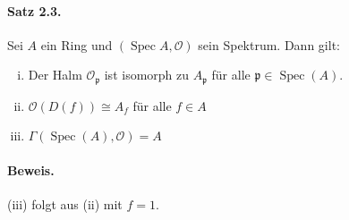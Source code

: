 \paragraph{Satz 2.3.}\label{2.3} Sei $A$ ein Ring und $(\operatorname{Spec} A,\mathcal{O})$ sein Spektrum. Dann gilt:
\begin{enumerate}[(i)]
\item Der Halm $\mathcal{O}_\mathfrak{p}$ ist isomorph zu $A_\mathfrak{p}$ für alle $\mathfrak{p}\in\operatorname{Spec}(A)$.
\item $\mathcal{O}(D(f))\cong A_f$ für alle $f\in A$
\item $\Gamma(\operatorname{Spec}(A),\mathcal{O})=A$
\end{enumerate}

\paragraph{Beweis.} (iii) folgt aus (ii) mit $f=1$.
